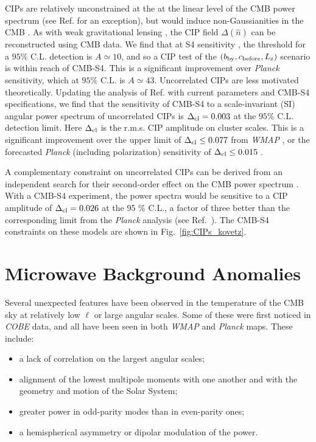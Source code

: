 CIPs are relatively unconstrained at the at the linear level of the CMB power spectrum (see Ref. \cite{Munoz:2015fdv} for an exception), but would induce non-Gaussianities in the CMB \cite{Grin:2011nk,Grin:2011tf,Grin:2013uya,He:2015msa}. As with weak gravitational lensing \cite{Hu:2001kj}, the CIP field $\Delta(\hat{n})$ can be reconstructed using CMB data. We find that at S4 sensitivity \cite{He:2015msa}, the threshold for a $95\%$ C.L. detection is $A\simeq 10$, and so a CIP test of the $(b_{\rm by}, c_{\rm before}, L_{\rm z})$ scenario is within reach of CMB-S4. This is a significant improvement over \emph{Planck} sensitivity, which at $95\%$ C.L. is $A\simeq 43$. Uncorrelated CIPs are less  motivated theoretically. Updating the analysis of Ref. \cite{He:2015msa} with current parameters \cite{Ade:2015lrj} and CMB-S4 specifications, we find that the sensitivity of CMB-S4 to a scale-invariant (SI) angular power spectrum of uncorrelated CIPs is $\Delta_{\rm cl}=0.003$ at the $95\%$ C.L. detection limit. Here $\Delta_{\rm cl}$ is the r.m.s. CIP amplitude on cluster scales. This is a significant improvement over the upper limit of $\Delta_{\rm cl}\leq 0.077$ from {\it WMAP\/} \cite{Grin:2013uya}, or the forecasted {\it Planck\/} \cite{Ade:2015lrj} (including polarization) sensitivity of $\Delta_{\rm cl}\leq 0.015$ \cite{He:2015msa}. 

A complementary constraint on uncorrelated CIPs can be derived from an independent search for their second-order effect on the CMB power spectrum \cite{Munoz:2015fdv}. With a CMB-S4 experiment, the power spectra would be sensitive to a CIP amplitude of $\Delta_{\rm cl} = 0.026$ at the 95 \% C.L., a factor of three better than the corresponding limit from the {\it Planck\/} analysis (see Ref.~\cite{Munoz:2015fdv}). The CMB-S4 constraints on these models are shown in Fig.~\ref{fig:CIPs_kovetz}.


\section{Microwave Background Anomalies}

Several unexpected features have been observed in the temperature of the CMB sky at relatively low $\ell$ or large angular scales.  Some of these were first noticed in {\it COBE\/} data,  
and all have been seen in both {\it WMAP\/} and {\it Planck\/} maps.  These include: 
\begin{itemize}
  \item a lack of correlation on the largest angular scales;
  \item alignment of the lowest multipole moments with one another and with the geometry and motion of the Solar System;
 \item greater power in odd-parity modes than in even-parity ones;
  \item a hemispherical asymmetry or dipolar modulation of the power.
\end{itemize}

